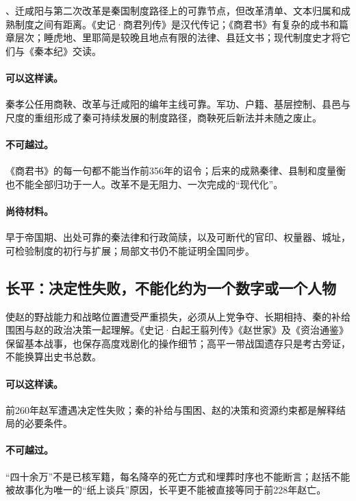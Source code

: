 、迁咸阳与第二次改革是秦国制度路径上的可靠节点，但改革清单、文本归属和成熟制度之间有距离。《史记·商君列传》是汉代传记；《商君书》有复杂的成书和篇章层次；睡虎地、里耶简是较晚且地点有限的法律、县廷文书；现代制度史才将它们与《秦本纪》交读。

\paragraph{可以这样读。}秦孝公任用商鞅、改革与迁咸阳的编年主线可靠。军功、户籍、基层控制、县邑与尺度的重组形成了秦可持续发展的制度路径，商鞅死后新法并未随之废止。

\paragraph{不可越过。}《商君书》的每一句都不能当作前356年的诏令；后来的成熟秦律、县制和度量衡也不能全部归功于一人。改革不是无阻力、一次完成的“现代化”。

\paragraph{尚待材料。}早于帝国期、出处可靠的秦法律和行政简牍，以及可断代的官印、权量器、城址，可检验制度的初行与扩展；局部文书仍不能证明全国同步。

\subsection{长平：决定性失败，不能化约为一个数字或一个人物}

使赵的野战能力和战略位置遭受严重损失，必须从上党争夺、长期相持、秦的补给围困与赵的政治决策一起理解。《史记·白起王翦列传》《赵世家》及《资治通鉴》保留基本战事，也保存高度戏剧化的操作细节；高平一带战国遗存只是考古旁证，不能换算出史书总数。

\paragraph{可以这样读。}前260年赵军遭遇决定性失败；秦的补给与围困、赵的决策和资源约束都是解释结局的必要条件。

\paragraph{不可越过。}“四十余万”不是已核军籍，每名降卒的死亡方式和埋葬时序也不能断言；赵括不能被故事化为唯一的“纸上谈兵”原因，长平更不能被直接等同于前228年赵亡。

